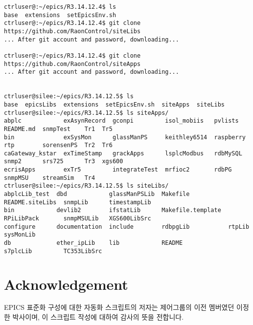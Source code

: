 \documentclass[11pt
  , a4paper
  , article
  , oneside
]{memoir}
\begin{document}
\begin{lstlisting}[style=termstyle]
ctrluser@:~/epics/R3.14.12.4$ ls
base  extensions  setEpicsEnv.sh
ctrluser@:~/epics/R3.14.12.4$ git clone https://github.com/RaonControl/siteLibs
... After git account and password, downloading...

ctrluser@:~/epics/R3.14.12.4$ git clone https://github.com/RaonControl/siteApps
... After git account and password, downloading...


ctrluser@silee:~/epics/R3.14.12.5$ ls
base  epicsLibs  extensions  setEpicsEnv.sh  siteApps  siteLibs
ctrluser@silee:~/epics/R3.14.12.5$ ls siteApps/
abplc            exAsynRecord  gconpi         isol_mobiis   pvlists    README.md  snmpTest    Tr1  Tr5
bin              exSysMon      glassManPS     keithley6514  raspberry  rtp        sorensenPS  Tr2  Tr6
caGateway_kstar  exTimeStamp   grackApps      lsplcModbus   rdbMySQL   snmp2      srs725      Tr3  xgs600
ecrisApps        exTr5         integrateTest  mrfioc2       rdbPG      snmpMSU    streamSim   Tr4
ctrluser@silee:~/epics/R3.14.12.5$ ls siteLibs/
abplcLib_test  dbd            glassManPSLib  Makefile           README.siteLibs  snmpLib      timestampLib
bin            devlib2        ifstatLib      Makefile.template  RPiLibPack       snmpMSULib   XGS600LibSrc
configure      documentation  include        rdbpgLib           rtpLib           sysMonLib
db             ether_ipLib    lib            README             s7plcLib         TC353LibSrc
\end{lstlisting}




\chapter{Acknowledgement}
EPICS 표준화 구성에 대한 자동화 스크립트의 저자는 제어그룹의 이전 멤버였던 이정한 박사이며, 이 스크립트 작성에 대하여 감사의 뜻을 전합니다.

\clearpage



\end{document}
